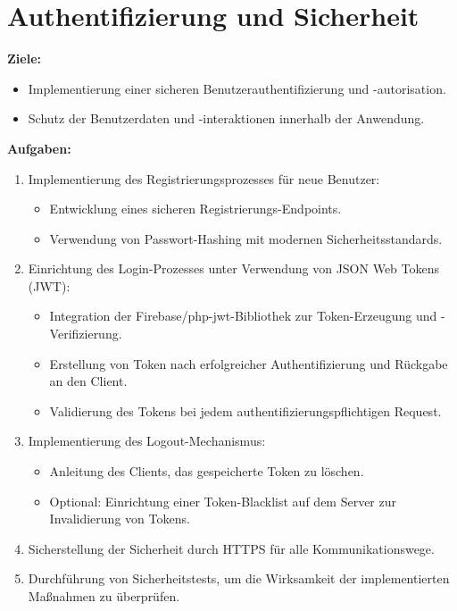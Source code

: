 \documentclass{article}
\begin{document}
\section{Authentifizierung und Sicherheit}
\textbf{Ziele:}
\begin{itemize}
	\item Implementierung einer sicheren Benutzerauthentifizierung und -autorisation.
	\item Schutz der Benutzerdaten und -interaktionen innerhalb der Anwendung.
\end{itemize}
\textbf{Aufgaben:}
\begin{enumerate}
	\item Implementierung des Registrierungsprozesses für neue Benutzer:
	\begin{itemize}
		\item Entwicklung eines sicheren Registrierungs-Endpoints.
		\item Verwendung von Passwort-Hashing mit modernen Sicherheitsstandards.
	\end{itemize}
	\item Einrichtung des Login-Prozesses unter Verwendung von JSON Web Tokens (JWT):
	\begin{itemize}
		\item Integration der Firebase/php-jwt-Bibliothek zur Token-Erzeugung und -Verifizierung.
		\item Erstellung von Token nach erfolgreicher Authentifizierung und Rückgabe an den Client.
		\item Validierung des Tokens bei jedem authentifizierungspflichtigen Request.
	\end{itemize}
	\item Implementierung des Logout-Mechanismus:
	\begin{itemize}
		\item Anleitung des Clients, das gespeicherte Token zu löschen.
		\item Optional: Einrichtung einer Token-Blacklist auf dem Server zur Invalidierung von Tokens.
	\end{itemize}
	\item Sicherstellung der Sicherheit durch HTTPS für alle Kommunikationswege.
	\item Durchführung von Sicherheitstests, um die Wirksamkeit der implementierten Maßnahmen zu überprüfen.
\end{enumerate}
\end{document}
